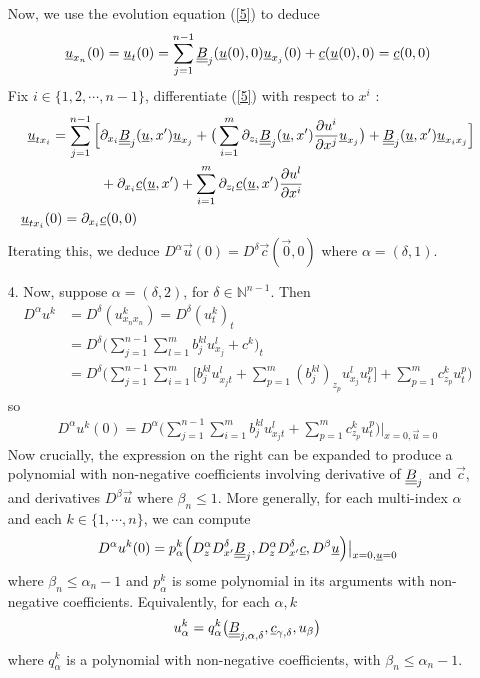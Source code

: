 \documentclass[10pt,a4paper]{report}
\newenvironment{proof}
{\begin{changemargin}{1cm}{0.5cm} 
	}%
	{\end{changemargin}
}
\begin{document}
\begin{proof}
\begin{itemize}
Now, we use the evolution equation (\ref{5}) to deduce
\begin{align*}
\underline{u}_{x_n}(0)  = \underline{u}_t (0) = \sum_{j=1}^{n-1} \underline{\underline{B}}_j(\underline{u}(0),0) \underline{u}_{x_j}(0) + \underline{c}(\underline{u}(0),0) = \underline{c}(0,0)
\end{align*}
Fix $i\in \{1,2,\cdots, n-1\}$, differentiate (\ref{5}) with respect to $x^i$ : 
\begin{align*}
\underline{u}_{tx_i} = \sum_{j=1}^{n-1} \Big[ & \partial_{x_i} \underline{\underline{B}}_j(\underline{u},x') \underline{u}_{x_j} + \big( \sum_{i=1}^m \partial_{z_i}\underline{\underline{B}}_j (\underline{u},x') \frac{\partial u^i}{\partial x^j} \underline{u}_{x_j} \big) + \underline{\underline{B}}_j(\underline{u},x')\underline{u}_{x_i x_j} \Big] \\
& + \partial_{x_i} \underline{c}(\underline{u},x') + \sum_{i=1}^m \partial_{z_l} \underline{c}(\underline{u},x') \frac{\partial u^{l}}{\partial x^i} \\
\underline{u}_{tx_i}(0) = \partial_{x_i} & \underline{c}(0,0)
\end{align*}
Iterating this, we deduce $D^{\alpha}\vec{u}(0) = D^{\delta} \vec{c}(\vec{0},0)$ where $\alpha=(\delta,1)$. 

\item[4. ] Now, suppose $\alpha = (\delta,2)$, for $\delta \in \mathbb{N}^{n-1}$. Then
\begin{align*}
D^{\alpha} u^k &= D^{\delta}(u^k_{x_n x_n}) = D^{\delta}(u^k_t)_t \\
&= D^{\delta}\Big( \sum_{j=1}^{n-1}\sum_{l=1}^m b_j^{kl} u_{x_j}^l + c^k \Big)_t \\
&= D^{\delta}\Big( \sum_{j=1}^{n-1} \sum_{i=1}^m \Big[ b_j^{kl} u_{x_j t}^l + \sum_{p=1}^m (b_j^{kl})_{z_p} u_{x_j}^l u_t^p \Big] + \sum_{p=1}^m c_{z_p}^k u_t^p  \Big)
\end{align*}
so
\begin{align*}
D^{\alpha} u^k (0) = D^{\alpha} \Big( \sum_{j=1}^{n-1} \sum_{i=1}^m  b_j^{kl} u_{x_j t}^l + \sum_{p=1}^m c_{z_p}^k u_t^p \Big) \Big|_{x=0,\vec{u}=0}
\end{align*}
Now crucially, the expression on the right can be expanded to produce a polynomial with non-negative coefficients involving derivative of $\underline{\underline{B}}_j$ and $\vec{c}$, and derivatives $D^{\beta} \vec{u}$ where $\beta_n \leq 1$. More generally, for each multi-index $\alpha$ and each $k\in \{1,\cdots, n\}$, we can compute
\begin{align*}
D^{\alpha}u^k(0) = p_{\alpha}^k \Big( D_z^{\alpha} D^{\delta}_{x'}\underline{\underline{B}}_j, D_z^{\alpha}D_{x'}^{\delta} \underline{c}, D^{\beta} \underline{u}\Big) \big|_{x=0,\underline{u}=0}
\end{align*}
where $\beta_n\leq \alpha_n -1$ and $p_{\alpha}^k$ is some polynomial in its arguments with non-negative coefficients. Equivalently, for each $\alpha, k$
\begin{align*}
u_{\alpha}^k = q_{\alpha}^k \big( \underline{\underline{B}}_{j,\alpha,\delta},\underline{c}_{\gamma, \delta},u_{\beta}  \big)
\end{align*}
where $q_{\alpha}^k$ is a polynomial with non-negative coefficients, with $\beta_n \leq \alpha_n -1$.


\end{itemize}
\end{proof}
\end{document}
